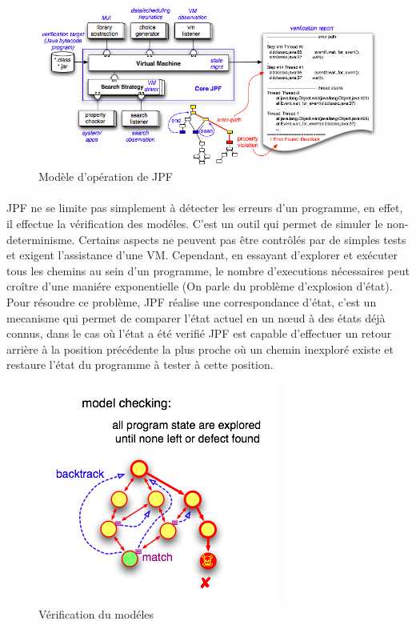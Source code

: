 			\begin{figure}[H]
				\centering
					\includegraphics[scale=0.5]{images/jpf-model.png}
				\caption{Modèle d'opération de \gls{JPF}}
			\end{figure}
	
			\paragraph{}
				\gls{JPF} ne se limite pas simplement à détecter les erreurs d'un programme, en effet, il effectue la vérification des modéles.
				C'est un outil qui permet de simuler le non-determinisme. Certains aspects ne peuvent pas être contrôlés par de simples tests et exigent l'assistance d'une \gls{VM}.
				Cependant, en essayant d'explorer et exécuter tous les chemins au sein d'un programme, le nombre d'executions nécessaires peut croître d'une maniére exponentielle (On parle du problème d'explosion d'état). 
				Pour résoudre ce problème, \gls{JPF} réalise une correspondance d'état, c'est un mecanisme qui permet de comparer
				l'état actuel en un n\oe{}ud à des états déjà connus, dans le cas où l'état
				a été verifié \gls{JPF} est capable d'effectuer un retour arrière à la position précédente la plus proche où un chemin inexploré existe et restaure l'état du programme à tester à cette position.
	
			\begin{figure}[H]
				\centering
					\includegraphics[scale=0.5]{images/jpf-model-checking.png}
				\caption{Vérification du modéles}
			\end{figure}
      
